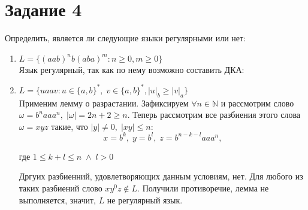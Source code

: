 \documentclass{article}
\begin{document}
    \section*{Задание 4}
    Определить, является ли следующие языки регулярными или нет:\\

    \begin{enumerate}
        \item \(L=\{(aab)^{n}b(aba)^{m} : n \geqslant 0, m \geqslant 0\}\)\\
        Язык регулярный, так как по нему возможно составить ДКА:
        \begin{center}
        \end{center}
    
        \item \(L = \{uaav : u \in \{a, b\}^*, \; v \in \{a, b\}^*, |u|_b \geqslant |v|_a\}\)\\
        Применим лемму о разрастании. Зафиксируем \(\forall n \in \mathbb{N} \) и рассмотрим слово \(\omega = b^naaa^n, \; |\omega| = 2n + 2 \geq n\). Теперь рассмотрим все разбиения этого слова \(\omega = xyz\) такие, что \(|y| \neq 0, \; |xy| \leq n\):
        $$x = b^{k}, \; y = b^{l}, \; z = b^{n - k - l}aaa^n,$$ \begin{center}
            где \(1 \leq k + l \leq n \; \wedge \; l > 0\)
        \end{center} 
        Дргуих разбиенний, удовлетворяющих данным условиям, нет.
        Для любого из таких разбиений слово \(xy^0z \notin L\). Получили противоречие, лемма не выполняется, значит, \(L\) не регулярный язык.
    \end{enumerate}
     
\end{document}
